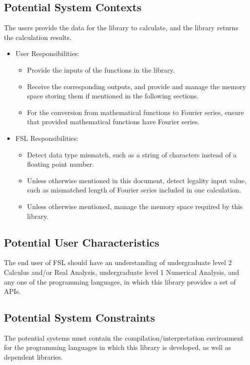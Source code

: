 \documentclass[12pt]{article}
\newcommand{\famname}{FSL} %
\begin{document}
\subsection{Potential System Contexts}

The users provide the data for the library to  calculate, and the library returns the calculation results.
\begin{itemize}
\item User Responsibilities:
\begin{itemize}
\item Provide the inputs of the functions in the library.
\item Receive the corresponding outputs, and provide and manage the memory space storing them if mentioned in the following sections.
\item For the conversion from mathematical functions to Fourier series, ensure that provided mathematical functions have Fourier series. 

\end{itemize}
\item \famname{} Responsibilities:
\begin{itemize}
\item Detect data type mismatch, such as a string of characters instead of a
  floating point number.
\item Unless otherwise mentioned in this document, detect legality input value, such as mismatched length of Fourier series included in one calculation.
\item Unless otherwise mentioned, manage the memory space required by this library.
\end{itemize}
\end{itemize}

\subsection{Potential User Characteristics} \label{SecUserCharacteristics}

The end user of \famname{} should have an understanding of undergraduate level 2 Calculus and/or Real Analysis, undergraduate level 1 Numerical Analysis, and any one of the programming languages, in which this library provides a set of APIs.

\subsection{Potential System Constraints}
The potential systems must contain the compilation/interpretation environment for the programming languages in which this library is developed, as well as dependent libraries.
\end{document}
